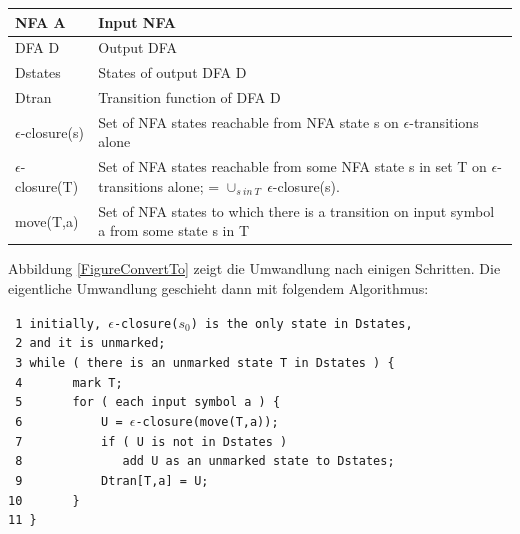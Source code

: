 \noindent
\begin{tabular}{|p{2.2cm}|p{9.0cm}|}
  \hline
  NFA A                 & Input NFA \\
  \hline
  DFA D                 & Output DFA \\
  \hline
  Dstates               & States of output DFA D \\
  \hline
  Dtran                 & Transition function of DFA D \\
  \hline
  $\epsilon$-closure(s) & Set of NFA states reachable from NFA state s
                          on $\epsilon$-transitions alone \\
  \hline
  $\epsilon$-closure(T) & Set of NFA states reachable from some NFA state s
                          in set T on $\epsilon$-transitions alone; =
                          $\cup_{s\ in\ T}\ \epsilon$-closure(s). \\
  \hline
  move(T,a)             & Set of NFA states to which there is a transition
                          on input symbol a from some state s in T \\
  \hline
\end{tabular}
\vspace{10pt}

Abbildung \ref{FigureConvertTo} zeigt die Umwandlung nach einigen Schritten. Die
eigentliche Umwandlung geschieht dann mit folgendem Algorithmus:\vspace{10pt}

\noindent
\verb| 1 initially, |$\epsilon$\verb|-closure(|$s_0$\verb|) is the only state in Dstates,|\\
\verb| 2 and it is unmarked;|\\
\verb| 3 while ( there is an unmarked state T in Dstates ) {|\\
\verb| 4       mark T;|\\
\verb| 5       for ( each input symbol a ) {|\\
\verb| 6           U = |$\epsilon$\verb|-closure(move(T,a));|\\
\verb| 7           if ( U is not in Dstates )|\\
\verb| 8              add U as an unmarked state to Dstates;|\\
\verb| 9           Dtran[T,a] = U;|\\
\verb|10       }|\\
\verb|11 }|
\vspace{10pt}

